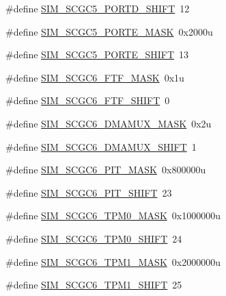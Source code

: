 \begin{DoxyCompactItemize}
\item 
\#define \hyperlink{group___s_i_m___register___masks_gad5f267781fcedf0fcdc0c4d3607c10cb}{S\+I\+M\+\_\+\+S\+C\+G\+C5\+\_\+\+P\+O\+R\+T\+D\+\_\+\+S\+H\+I\+FT}~12
\item 
\#define \hyperlink{group___s_i_m___register___masks_ga3d5e3e51d345fe424a4f24aa9ae73dc1}{S\+I\+M\+\_\+\+S\+C\+G\+C5\+\_\+\+P\+O\+R\+T\+E\+\_\+\+M\+A\+SK}~0x2000u
\item 
\#define \hyperlink{group___s_i_m___register___masks_gae717813cf38c35e5e4ea4243e939b4bc}{S\+I\+M\+\_\+\+S\+C\+G\+C5\+\_\+\+P\+O\+R\+T\+E\+\_\+\+S\+H\+I\+FT}~13
\item 
\#define \hyperlink{group___s_i_m___register___masks_ga949452096cb8609fdb3503dda3f9f729}{S\+I\+M\+\_\+\+S\+C\+G\+C6\+\_\+\+F\+T\+F\+\_\+\+M\+A\+SK}~0x1u
\item 
\#define \hyperlink{group___s_i_m___register___masks_gaf767cc087ed5983b84e79996586efb12}{S\+I\+M\+\_\+\+S\+C\+G\+C6\+\_\+\+F\+T\+F\+\_\+\+S\+H\+I\+FT}~0
\item 
\#define \hyperlink{group___s_i_m___register___masks_ga10469a89e2c48cd79e29fb73b0d06395}{S\+I\+M\+\_\+\+S\+C\+G\+C6\+\_\+\+D\+M\+A\+M\+U\+X\+\_\+\+M\+A\+SK}~0x2u
\item 
\#define \hyperlink{group___s_i_m___register___masks_gaa69ac431213fb94ecd1d9ed2fa966e50}{S\+I\+M\+\_\+\+S\+C\+G\+C6\+\_\+\+D\+M\+A\+M\+U\+X\+\_\+\+S\+H\+I\+FT}~1
\item 
\#define \hyperlink{group___s_i_m___register___masks_gaf5baabd241aba695593ce6369aa56ee2}{S\+I\+M\+\_\+\+S\+C\+G\+C6\+\_\+\+P\+I\+T\+\_\+\+M\+A\+SK}~0x800000u
\item 
\#define \hyperlink{group___s_i_m___register___masks_ga2600ceb860eb353aa61abbecdbf5b6ae}{S\+I\+M\+\_\+\+S\+C\+G\+C6\+\_\+\+P\+I\+T\+\_\+\+S\+H\+I\+FT}~23
\item 
\#define \hyperlink{group___s_i_m___register___masks_gad879476f2922fd7dad2f65d3d052e95d}{S\+I\+M\+\_\+\+S\+C\+G\+C6\+\_\+\+T\+P\+M0\+\_\+\+M\+A\+SK}~0x1000000u
\item 
\#define \hyperlink{group___s_i_m___register___masks_ga9e379c439a6d1d14f65b4c58c46453c5}{S\+I\+M\+\_\+\+S\+C\+G\+C6\+\_\+\+T\+P\+M0\+\_\+\+S\+H\+I\+FT}~24
\item 
\#define \hyperlink{group___s_i_m___register___masks_ga94a77c9065fd06f267b9920024067cd6}{S\+I\+M\+\_\+\+S\+C\+G\+C6\+\_\+\+T\+P\+M1\+\_\+\+M\+A\+SK}~0x2000000u
\item 
\#define \hyperlink{group___s_i_m___register___masks_ga26bf0c38385affd6680bb0f4853e43df}{S\+I\+M\+\_\+\+S\+C\+G\+C6\+\_\+\+T\+P\+M1\+\_\+\+S\+H\+I\+FT}~25

\end{DoxyCompactItemize}
